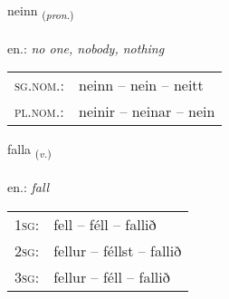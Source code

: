 \documentclass[frontgrid, backgrid]{flacards}\usepackage[]{graphicx}\usepackage[]{xcolor}
\begin{document}
\renewcommand{\flhead}{\vskip5pt \fboxsep=0pt {\small\bfseries\footnotesize Fornafn | Pronoun}}
\renewcommand{\fcfoot}{\vskip5pt \fboxsep=0pt \hspace{2pt}{\small\bfseries\footnotesize 1K}}

\renewcommand{\blhead}{\vskip5pt {\small\bfseries\footnotesize Fornafn | Pronoun }}
\renewcommand{\bcfoot}{\vskip5pt \hspace{2pt}{\small\bfseries\footnotesize 1K}}


{neinn \small{\textsubscript{(\textit{pron.})}} \\[1ex] %
\textphonetic{[neitn̥]} \\
en.: \emph{no one, nobody, nothing} \\  [2ex]
\renewcommand*{\arraystretch}{0.8}
\begin{tabular}{ll}
\textsc{sg.nom.}: & neinn  --  nein -- neitt \\ 
\textsc{pl.nom.}: & neinir -- neinar -- nein
\end{tabular}
}

\renewcommand{\flhead}{\vskip5pt \fboxsep=0pt {\small\bfseries\footnotesize Sagnorð | Verb}}
\renewcommand{\fcfoot}{\vskip5pt \fboxsep=0pt \hspace{2pt}{\small\bfseries\footnotesize 1K}}

\renewcommand{\blhead}{\vskip5pt {\small\bfseries\footnotesize Sagnorð | Verb }}
\renewcommand{\bcfoot}{\vskip5pt \hspace{2pt}{\small\bfseries\footnotesize 1K}}


{falla \small{\textsubscript{(\textit{v.})}} \\[1ex] %
\textphonetic{[fatla]} \\
en.: \emph{fall} \\  [2ex]
\renewcommand*{\arraystretch}{0.8}
\begin{tabular}{p{1cm}l}
\textsc{1sg}: & fell -- féll -- fallið \\ 
\textsc{2sg}: & fellur -- féllst -- fallið \\ 
\textsc{3sg}: & fellur -- féll -- fallið \\ 
\end{tabular}
}
\end{document}
